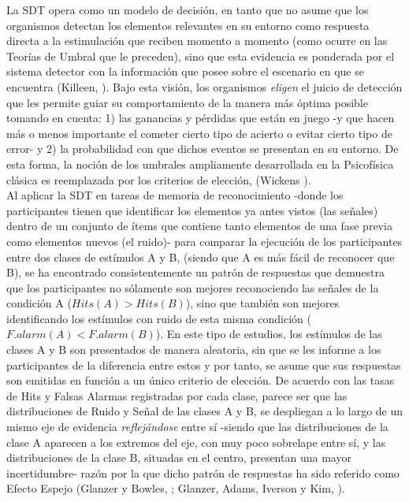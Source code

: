 La SDT opera como un modelo de decisión, en tanto que no asume que los organismos detectan los elementos relevantes en su entorno como respuesta directa a la estimulación que reciben momento a momento (como ocurre en las Teorías de Umbral que le preceden), sino que esta evidencia es ponderada por el sistema detector con la información que posee sobre el escenario en que se encuentra (Killeen, \citeyear{Killeen2014}). Bajo esta visión, los organismos \textit{eligen} el juicio de detección que les permite guiar su comportamiento de la manera más óptima posible tomando en cuenta: 1) las ganancias y pérdidas que están en juego -y que hacen más o menos importante el cometer cierto tipo de acierto o evitar cierto tipo de error- y 2) la probabilidad con que dichos eventos se presentan en su entorno. De esta forma, la noción de los umbrales ampliamente desarrollada en la Psicofísica clásica es reemplazada por los criterios de elección, (Wickens \citeyear{Wickens1}).\\ 

Al aplicar la SDT en tareas de memoria de reconocimiento -donde los participantes tienen que identificar los elementos ya antes vistos (las señales) dentro de un conjunto de ítems que contiene tanto elementos de una fase previa como elementos nuevos (el ruido)- para comparar la ejecución de los participantes entre dos clases de estímulos A y B, (siendo que A es más fácil de reconocer que B), se ha encontrado consistentemente un patrón de respuestas que demuestra que los participantes no sólamente son mejores reconociendo las señales de la condición A ($Hits(A)>Hits(B)$), sino que también son mejores identificando los estímulos con ruido de esta misma condición ($F.alarm(A)<F.alarm(B)$). En este tipo de estudios, los estímulos de las clases A y B son presentados de manera aleatoria, sin que se les informe a los participantes de la diferencia entre estos y por tanto, se asume que sus respuestas son emitidas en función a un único criterio de elección. De acuerdo con las tasas de Hits y Falsas Alarmas registradas por cada clase, parece ser que las distribuciones de Ruido y Señal de las clases A y B, se despliegan a lo largo de un mismo eje de evidencia \textit{reflejándose} entre sí -siendo que las distribuciones de la clase A aparecen a los extremos del eje, con muy poco sobrelape entre sí, y las distribuciones de la clase B, situadas en el centro, presentan una mayor incertidumbre- razón por la que dicho patrón de respuestas ha sido referido como Efecto Espejo (Glanzer y Bowles, \citeyear{Glanzer1976}; Glanzer, Adams, Iverson y Kim, \citeyear{Glanzer1993}).\\

